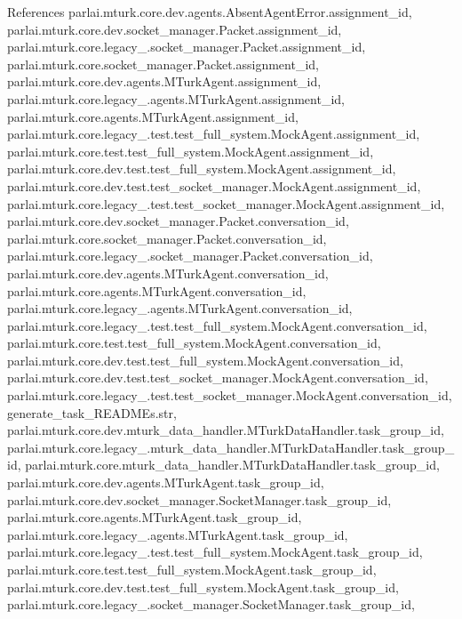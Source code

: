 References parlai.\+mturk.\+core.\+dev.\+agents.\+Absent\+Agent\+Error.\+assignment\+\_\+id, parlai.\+mturk.\+core.\+dev.\+socket\+\_\+manager.\+Packet.\+assignment\+\_\+id, parlai.\+mturk.\+core.\+legacy\+\_.\+socket\+\_\+manager.\+Packet.\+assignment\+\_\+id, parlai.\+mturk.\+core.\+socket\+\_\+manager.\+Packet.\+assignment\+\_\+id, parlai.\+mturk.\+core.\+dev.\+agents.\+M\+Turk\+Agent.\+assignment\+\_\+id, parlai.\+mturk.\+core.\+legacy\+\_.\+agents.\+M\+Turk\+Agent.\+assignment\+\_\+id, parlai.\+mturk.\+core.\+agents.\+M\+Turk\+Agent.\+assignment\+\_\+id, parlai.\+mturk.\+core.\+legacy\+\_.\+test.\+test\+\_\+full\+\_\+system.\+Mock\+Agent.\+assignment\+\_\+id, parlai.\+mturk.\+core.\+test.\+test\+\_\+full\+\_\+system.\+Mock\+Agent.\+assignment\+\_\+id, parlai.\+mturk.\+core.\+dev.\+test.\+test\+\_\+full\+\_\+system.\+Mock\+Agent.\+assignment\+\_\+id, parlai.\+mturk.\+core.\+dev.\+test.\+test\+\_\+socket\+\_\+manager.\+Mock\+Agent.\+assignment\+\_\+id, parlai.\+mturk.\+core.\+legacy\+\_.\+test.\+test\+\_\+socket\+\_\+manager.\+Mock\+Agent.\+assignment\+\_\+id, parlai.\+mturk.\+core.\+dev.\+socket\+\_\+manager.\+Packet.\+conversation\+\_\+id, parlai.\+mturk.\+core.\+socket\+\_\+manager.\+Packet.\+conversation\+\_\+id, parlai.\+mturk.\+core.\+legacy\+\_.\+socket\+\_\+manager.\+Packet.\+conversation\+\_\+id, parlai.\+mturk.\+core.\+dev.\+agents.\+M\+Turk\+Agent.\+conversation\+\_\+id, parlai.\+mturk.\+core.\+agents.\+M\+Turk\+Agent.\+conversation\+\_\+id, parlai.\+mturk.\+core.\+legacy\+\_.\+agents.\+M\+Turk\+Agent.\+conversation\+\_\+id, parlai.\+mturk.\+core.\+legacy\+\_.\+test.\+test\+\_\+full\+\_\+system.\+Mock\+Agent.\+conversation\+\_\+id, parlai.\+mturk.\+core.\+test.\+test\+\_\+full\+\_\+system.\+Mock\+Agent.\+conversation\+\_\+id, parlai.\+mturk.\+core.\+dev.\+test.\+test\+\_\+full\+\_\+system.\+Mock\+Agent.\+conversation\+\_\+id, parlai.\+mturk.\+core.\+dev.\+test.\+test\+\_\+socket\+\_\+manager.\+Mock\+Agent.\+conversation\+\_\+id, parlai.\+mturk.\+core.\+legacy\+\_.\+test.\+test\+\_\+socket\+\_\+manager.\+Mock\+Agent.\+conversation\+\_\+id, generate\+\_\+task\+\_\+\+R\+E\+A\+D\+M\+Es.\+str, parlai.\+mturk.\+core.\+dev.\+mturk\+\_\+data\+\_\+handler.\+M\+Turk\+Data\+Handler.\+task\+\_\+group\+\_\+id, parlai.\+mturk.\+core.\+legacy\+\_.\+mturk\+\_\+data\+\_\+handler.\+M\+Turk\+Data\+Handler.\+task\+\_\+group\+\_\+id, parlai.\+mturk.\+core.\+mturk\+\_\+data\+\_\+handler.\+M\+Turk\+Data\+Handler.\+task\+\_\+group\+\_\+id, parlai.\+mturk.\+core.\+dev.\+agents.\+M\+Turk\+Agent.\+task\+\_\+group\+\_\+id, parlai.\+mturk.\+core.\+dev.\+socket\+\_\+manager.\+Socket\+Manager.\+task\+\_\+group\+\_\+id, parlai.\+mturk.\+core.\+agents.\+M\+Turk\+Agent.\+task\+\_\+group\+\_\+id, parlai.\+mturk.\+core.\+legacy\+\_.\+agents.\+M\+Turk\+Agent.\+task\+\_\+group\+\_\+id, parlai.\+mturk.\+core.\+legacy\+\_.\+test.\+test\+\_\+full\+\_\+system.\+Mock\+Agent.\+task\+\_\+group\+\_\+id, parlai.\+mturk.\+core.\+test.\+test\+\_\+full\+\_\+system.\+Mock\+Agent.\+task\+\_\+group\+\_\+id, parlai.\+mturk.\+core.\+dev.\+test.\+test\+\_\+full\+\_\+system.\+Mock\+Agent.\+task\+\_\+group\+\_\+id, parlai.\+mturk.\+core.\+legacy\+\_.\+socket\+\_\+manager.\+Socket\+Manager.\+task\+\_\+group\+\_\+id, 